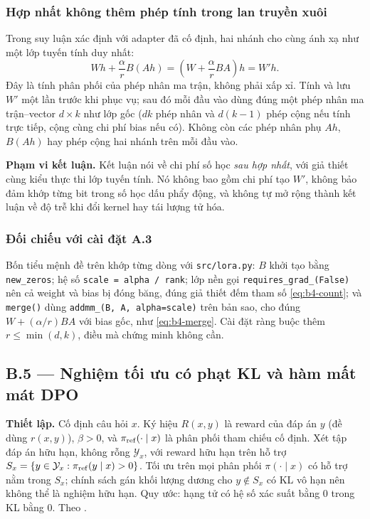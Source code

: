 \subsubsection{Hợp nhất không thêm phép tính trong lan truyền xuôi}

Trong suy luận xác định với adapter đã cố định, hai nhánh cho cùng ánh xạ như một
lớp tuyến tính duy nhất:
\begin{equation}
  Wh+\frac{\alpha}{r}B(Ah)=\left(W+\frac{\alpha}{r}BA\right)h=W'h.
  \label{eq:b4-merge}
\end{equation}
Đây là tính phân phối của phép nhân ma trận, không phải xấp xỉ. Tính và lưu $W'$
một lần trước khi phục vụ; sau đó mỗi đầu vào dùng đúng một phép nhân
ma trận--vector $d\times k$ như lớp gốc ($dk$ phép nhân và $d(k-1)$ phép cộng nếu
tính trực tiếp, cộng cùng chi phí bias nếu có). Không còn các phép nhân phụ $Ah$,
$B(Ah)$ hay phép cộng hai nhánh trên mỗi đầu vào.

\textbf{Phạm vi kết luận.} Kết luận nói về chi phí số học \emph{sau hợp nhất}, với
giả thiết cùng kiểu thực thi lớp tuyến tính. Nó không bao gồm chi phí tạo $W'$,
không bảo đảm khớp từng bit trong số học dấu phẩy động, và không tự mở rộng thành
kết luận về độ trễ khi đổi kernel hay tái lượng tử hóa.

\subsubsection{Đối chiếu với cài đặt A.3}

Bốn tiểu mệnh đề trên khớp từng dòng với \texttt{src/lora.py}: $B$ khởi tạo bằng
\texttt{new\_zeros}; hệ số \texttt{scale = alpha / rank}; lớp nền gọi
\texttt{requires\_grad\_(False)} nên cả weight và bias bị đóng băng, đúng giả thiết
đếm tham số \eqref{eq:b4-count}; và \texttt{merge()} dùng
\texttt{addmm\_(B, A, alpha=scale)} trên bản sao, cho đúng
$W+(\alpha/r)BA$ với bias gốc, như \eqref{eq:b4-merge}. Cài đặt ràng buộc thêm
$r\le\min(d,k)$, điều mà chứng minh không cần.

\subsection{B.5 --- Nghiệm tối ưu có phạt KL và hàm mất mát DPO}
\label{sec:b5}

\textbf{Thiết lập.} Cố định câu hỏi $x$. Ký hiệu $R(x,y)$ là reward của đáp án $y$
(đề dùng $r(x,y)$), $\beta>0$, và $\pi_{\mathrm{ref}}(\cdot\mid x)$ là phân phối tham chiếu cố
định. Xét tập đáp án hữu hạn, không rỗng $\mathcal Y_x$, với reward hữu hạn trên
hỗ trợ $S_x=\{y\in\mathcal Y_x:\pi_{\mathrm{ref}}(y\mid x)>0\}$. Tối ưu trên mọi phân phối
$\pi(\cdot\mid x)$ có hỗ trợ nằm trong $S_x$; chính sách gán khối lượng dương cho
$y\notin S_x$ có KL vô hạn nên không thể là nghiệm hữu hạn. Quy ước: hạng tử có hệ
số xác suất bằng $0$ trong KL bằng $0$. Theo
\cite[§3--4, phương trình (1)--(7), Phụ lục A.1--A.2]{dpo}.

